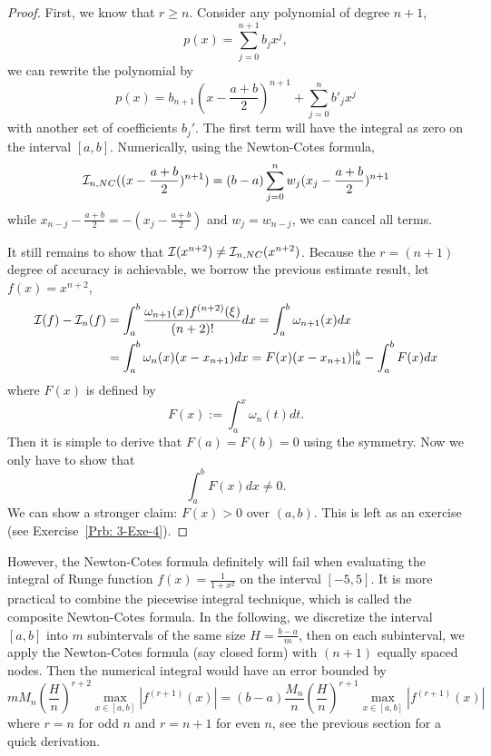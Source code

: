 \begin{proof}
    First, we know that $r\ge n$. Consider any polynomial of degree $n+1$, 
    \begin{equation}
        p(x) = \sum_{j=0}^{n+1} b_j x^j, 
    \end{equation}
    we can rewrite the polynomial by 
    \begin{equation}
        p(x) = b_{n+1} (x - \frac{a+b}{2})^{n+1} + \sum_{j=0}^n b'_j x^j 
    \end{equation}
    with another set of coefficients $b_j'$. The first term will have the integral as zero on the interval $[a, b]$. Numerically, using the Newton-Cotes formula, 
    \begin{equation}
        \mathcal I_{n, NC}( (x - \frac{a+b}{2})^{n+1}  ) = (b-a)\sum_{j=0}^n w_j  (x_j - \frac{a+b}{2})^{n+1}
    \end{equation}
    while $x_{n-j} -  \frac{a+b}{2} = -(x_j -  \frac{a+b}{2}) $ and $w_j = w_{n-j}$, we can cancel all terms. 

    It still remains to show that $\mathcal I(x^{n+2})\neq \mathcal I_{n,NC}(x^{n+2})$. Because the $r= (n+1)$ degree of accuracy is achievable, we borrow the previous estimate result, let $f(x) = x^{n+2}$, 
    \begin{equation}
        \begin{aligned}
            \mathcal I(f) - \mathcal I_n(f) &= \int_a^b \frac{\omega_{n+1}(x) f^{(n+2)}(\xi)}{(n+2)!} dx = \int_a^b \omega_{n+1}(x) dx \\
            &=     \int_a^b \omega_n(x) (x - x_{n+1}) dx = F(x) (x - x_{n+1})|_a^b - \int_a^b F(x) dx  
        \end{aligned}
    \end{equation}
    where $F(x)$ is defined by 
    $$F(x) := \int_a^x \omega_{n}(t) dt. $$ Then it is simple to derive that $F(a) = F(b) = 0$ using the symmetry. Now we only have to show that 
    $$\int_a^b F(x)dx \neq 0.$$
    We can show a stronger claim: $F(x)>  0$ over $(a, b)$. This is left as an exercise (see Exercise~\ref{Prb: 3-Exe-4}).
\end{proof}
However, the Newton-Cotes formula definitely will fail when evaluating the integral of Runge function $f(x) = \frac{1}{1+x^2}$ on the interval $[-5,5]$. It is more practical to combine the piecewise integral technique, which is called the composite Newton-Cotes formula. In the following, we discretize the interval $[a, b]$ into $m$ subintervals of the same size $H = \frac{b-a}{m}$, then on each subinterval, we apply the Newton-Cotes formula (say closed form) with $(n+1)$ equally spaced nodes. Then the numerical integral would have an error bounded by 
\begin{equation}
    m M_n \left(\frac{H}{n}\right)^{r+2} \max_{x\in[a, b]}|f^{(r+1)}(x)| =     (b-a) \frac{M_n}{n} \left(\frac{H}{n}\right)^{r+1} \max_{x\in[a, b]}|f^{(r+1)}(x)|
\end{equation}
where $r = n$ for odd $n$ and $r = n+1$ for even $n$, see the previous section for a quick derivation.

